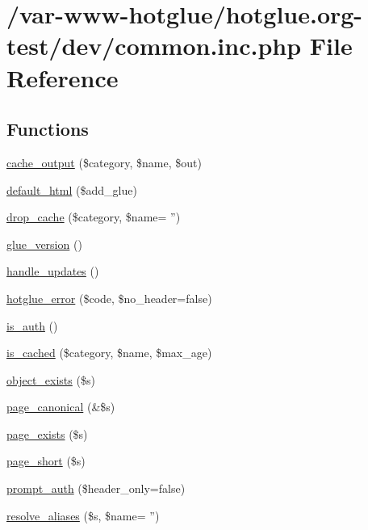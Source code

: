 \hypertarget{common_8inc_8php}{
\section{/var-\/www-\/hotglue/hotglue.org-\/test/dev/common.inc.php File Reference}
\label{common_8inc_8php}
}
\subsection*{Functions}
\begin{DoxyCompactItemize}
\item 
\hyperlink{common_8inc_8php_a6cceb5c6a3c421c18e925515c78f6dfd}{cache\_\-output} (\$category, \$name, \$out)
\item 
\hyperlink{common_8inc_8php_a8916cb6ec34ceeb3f48c86655c305974}{default\_\-html} (\$add\_\-glue)
\item 
\hyperlink{common_8inc_8php_a29be04ac495441a2d15a99fa6ef63e9d}{drop\_\-cache} (\$category, \$name= '')
\item 
\hyperlink{common_8inc_8php_a0d6d0da45f4adf6283bcccec9fd107e3}{glue\_\-version} ()
\item 
\hyperlink{common_8inc_8php_aa8712e8d1a52e2b8f00ecaf839205d24}{handle\_\-updates} ()
\item 
\hyperlink{common_8inc_8php_a7c4cb31a76aaf90f4399752ef35e00fe}{hotglue\_\-error} (\$code, \$no\_\-header=false)
\item 
\hyperlink{common_8inc_8php_ab3abbb2cd13e01231533e7cdc93da6db}{is\_\-auth} ()
\item 
\hyperlink{common_8inc_8php_a6fb34b9210b43349ca3eb16b2738a28b}{is\_\-cached} (\$category, \$name, \$max\_\-age)
\item 
\hyperlink{common_8inc_8php_a3d71a269e01b98748fb57719feef27be}{object\_\-exists} (\$s)
\item 
\hyperlink{common_8inc_8php_a31ed04b0c90ac3077e71743c307d45f8}{page\_\-canonical} (\&\$s)
\item 
\hyperlink{common_8inc_8php_aa71868111dd5b8af98df9cc9c968e523}{page\_\-exists} (\$s)
\item 
\hyperlink{common_8inc_8php_ada968adfb989aa09adaf29867208f1ab}{page\_\-short} (\$s)
\item 
\hyperlink{common_8inc_8php_a80c23c9d8ac02159151d6368506b1b54}{prompt\_\-auth} (\$header\_\-only=false)
\item 
\hyperlink{common_8inc_8php_a78992fdfae6cd9d7d4e8053d004d1709}{resolve\_\-aliases} (\$s, \$name= '')

\end{DoxyCompactItemize}
